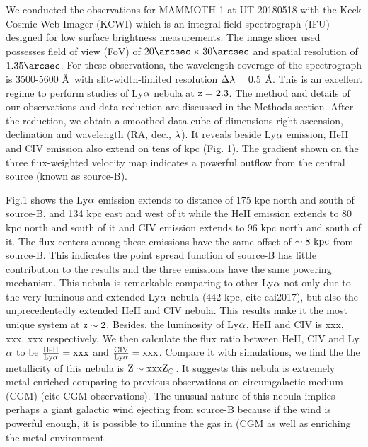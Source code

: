 \documentclass{nature}
\begin{document}
We conducted the observations for MAMMOTH-1 at UT-20180518 with the Keck Cosmic Web Imager (KCWI) which is an integral field spectrograph (IFU) designed for low surface brightness measurements. The image slicer used possesses field of view (FoV) of $\rm 20\arcsec \times 30\arcsec$ and spatial resolution of $\rm 1.35\arcsec$. For these observations, the wavelength coverage of the spectrograph is 3500-5600 \AA \ with slit-width-limited resolution $\rm \Delta \lambda=0.5$ \AA. This is an excellent regime to perform studies of Ly$\rm \alpha$ nebula at $\rm z=2.3$. The method and details of our observations and data reduction are discussed in the Methods section. After the reduction, we obtain a smoothed data cube of dimensions right ascension, declination and wavelength (RA, dec., $\rm \lambda$). It reveals beside Ly$\rm \alpha$ emission, HeII and CIV emission also extend on tens of kpc (Fig. 1). The gradient shown on the three flux-weighted velocity map indicates a powerful outflow from the central source (known as source-B). 

Fig.1 shows the Ly$\rm \alpha$ emission extends to distance of 175 kpc north and south of source-B, and 134 kpc east and west of it while the HeII emission extends to 80 kpc north and south of it and CIV emission extends to 96 kpc north and south of it. The flux centers among these emissions have the same offset of $\rm \sim 8 \ kpc$ from source-B. This indicates the point spread function of source-B has little contribution to the results and the three emissions have the same powering mechanism. This nebula is remarkable comparing to other Ly$\rm \alpha$ not only due to the very luminous and extended Ly$\rm \alpha$ nebula (442 kpc, cite cai2017), but also the unprecedentedly extended HeII and CIV nebula. This results make it the most unique system at $\rm z\sim 2$. Besides, the luminosity of Ly$\rm \alpha$, HeII and CIV is xxx, xxx, xxx respectively. We then calculate the flux ratio between HeII, CIV and Ly$\rm \alpha$ to be $\rm \frac{HeII}{Ly\alpha}=xxx$ and $\rm \frac{CIV}{Ly\alpha}=xxx$. Compare it with simulations, we find the the metallicity of this nebula is $\rm Z\sim xxx Z_{\odot}$. It suggests this nebula is extremely metal-enriched comparing to previous observations on circumgalactic medium (CGM) (cite CGM observations). The unusual nature of this nebula implies perhaps a giant galactic wind ejecting from source-B because if the wind is powerful enough, it is possible to illumine the gas in (CGM as well as enriching the metal environment.
\end{document}
